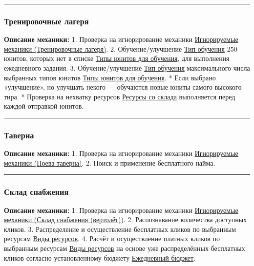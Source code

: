 \documentclass[
]{article}
\begin{document}
\begin{center}\rule{0.5\linewidth}{0.5pt}\end{center}

\subsubsection{Тренировочные
лагеря}\label{ux442ux440ux435ux43dux438ux440ux43eux432ux43eux447ux43dux44bux435-ux43bux430ux433ux435ux440ux44f}

\textbf{Описание механики:} 1. Проверка на игнорирование механики
\hyperref[ignor_states]{Игнорируемые механики (Тренировочные лагеря)}.
2. Обучение/улучшение \hyperref[train_type]{Тип обучения} 250 юнитов,
которых нет в списке \hyperref[train_unit_types]{Типы юнитов для
обучения}, для выполнения ежедневного задания. 3. Обучение/улучшение
\hyperref[train_type]{Тип обучения} максимального числа выбранных типов
юнитов \hyperref[train_unit_types]{Типы юнитов для обучения}. * Если
выбрано «улучшение», но улучшать некого — обучаются новые юниты самого
высокого тира. * Проверка на нехватку ресурсов
\hyperref[store_permit]{Ресурсы со склада} выполняется перед каждой
отправкой юнитов.

\begin{center}\rule{0.5\linewidth}{0.5pt}\end{center}

\subsubsection{Таверна}\label{ux442ux430ux432ux435ux440ux43dux430}

\textbf{Описание механики:} 1. Проверка на игнорирование механики
\hyperref[ignor_states]{Игнорируемые механики (Ноева таверна)}. 2. Поиск
и применение бесплатного найма.

\begin{center}\rule{0.5\linewidth}{0.5pt}\end{center}

\subsubsection{Склад
снабжения}\label{ux441ux43aux43bux430ux434-ux441ux43dux430ux431ux436ux435ux43dux438ux44f}

\textbf{Описание механики:} 1. Проверка на игнорирование механики
\hyperref[ignor_states]{Игнорируемые механики (Склад снабжения
(вертолёт))}. 2. Распознавание количества доступных кликов. 3.
Распределение и осуществление бесплатных кликов по выбранным ресурсам
\hyperref[supply_priority]{Виды ресурсов}. 4. Расчёт и осуществление
платных кликов по выбранным ресурсам \hyperref[supply_priority]{Виды
ресурсов} на основе уже распределённых бесплатных кликов согласно
установленному бюджету \hyperref[supply_diamonds_count]{Ежедневный
бюджет}.
\end{document}

